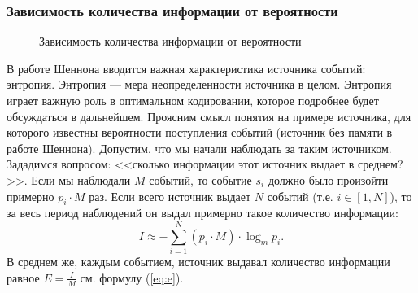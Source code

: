 \begin{frame}
\frametitle{Зависимость количества информации от вероятности}
\begin{figure}
    \begin{center}
    \end{center}
    \caption{Зависимость количества информации от вероятности}\label{pict:ip}
\end{figure} 
\end{frame}

В работе Шеннона вводится важная характеристика источника событий: энтропия. Энтропия --- мера неопределенности источника в целом. Энтропия играет важную роль в оптимальном кодировании, которое подробнее будет обсуждаться в дальнейшем. Проясним смысл понятия на примере источника, для которого известны вероятности поступления событий (источник без памяти в работе Шеннона). Допустим, что мы начали наблюдать за таким источником. Зададимся вопросом: <<сколько информации этот источник выдает в среднем?>>. Если мы наблюдали $M$ событий, то событие $s_i$ должно было произойти примерно  $p_i\cdot M$ раз. Если всего источник выдает $N$ событий (т.е. $i\in[1,N]$), то за весь период наблюдений он выдал примерно такое количество информации:
\[I\approx -\sum_{i=1}^{N}(p_i\cdot M) \cdot \log_{m}p_i.\]
В среднем же, каждым событием, источник выдавал количество информации равное $E=\frac{I}{M}$ см. формулу (\ref{eq:e}).

